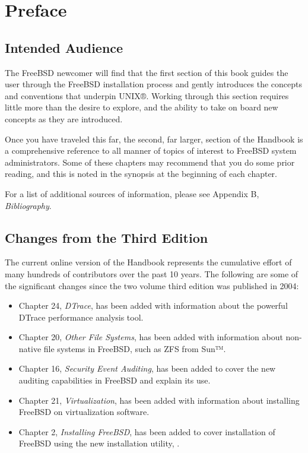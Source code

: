 \chapter{Preface}

\section{Intended Audience}

The FreeBSD newcomer will find that the first section of this book guides the
user through the FreeBSD installation process and gently introduces the concepts
and conventions that underpin UNIX®.
Working through this section requires little more than the desire to explore,
and the ability to take on board new concepts as they are introduced.

Once you have traveled this far, the second, far larger, section of the Handbook
is a comprehensive reference to all manner of topics of interest to FreeBSD
system administrators.
Some of these chapters may recommend that you do some prior reading, and this is
noted in the synopsis at the beginning of each chapter.

For a list of additional sources of information, please see Appendix B,
\emph{Bibliography}.




\section{Changes from the Third Edition}

The current online version of the Handbook represents the cumulative effort of
many hundreds of contributors over the past 10 years.
The following are some of the significant changes since the two volume third
edition was published in 2004:
\begin{itemize}
\item
   Chapter 24, \emph{DTrace}, has been added with information about the powerful
   DTrace performance analysis tool.
\item
   Chapter 20, \emph{Other File Systems}, has been added with information about
   non-native file systems in FreeBSD, such as ZFS from Sun™.
\item
   Chapter 16, \emph{Security Event Auditing}, has been added to cover the new
   auditing capabilities in FreeBSD and explain its use.
\item
   Chapter 21, \emph{Virtualization}, has been added with information about
   installing FreeBSD on virtualization software.
\item
   Chapter 2, \emph{Installing FreeBSD}, has been added to cover installation of
   FreeBSD using the new installation utility, .
\end{itemize}



